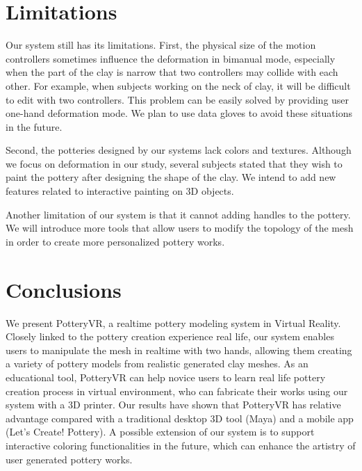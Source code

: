 \section{Limitations}
\label{sec:7}

Our system still has its limitations. First, the physical size of the motion controllers sometimes influence the deformation in bimanual mode, especially when the part of the clay is narrow that two controllers may collide with each other. For example, when subjects working on the neck of clay, it will be difficult to edit with two controllers. This problem can be easily solved by providing user one-hand deformation mode. We plan to use data gloves to avoid these situations in the future.

Second, the potteries designed by our systems lack colors and textures. Although we focus on deformation in our study, several subjects stated that they wish to paint the pottery after designing the shape of the clay. We intend to add new features related to interactive painting on 3D objects.

Another limitation of our system is that it cannot adding handles to the pottery. We will introduce more tools that allow users to modify the topology of the mesh in order to create more personalized pottery works.


\section{Conclusions}
\label{sec:8}

We present PotteryVR, a realtime pottery modeling system in Virtual Reality.
Closely linked to the pottery creation experience real life, our system enables users to manipulate the mesh in realtime with two hands, allowing them creating a variety of pottery models from realistic generated clay meshes.
As an educational tool, PotteryVR can help novice users to learn real life pottery creation process in virtual environment, who can fabricate their works using our system with a 3D printer.
Our results have shown that PotteryVR has relative advantage compared with a traditional desktop 3D tool (Maya) and a mobile app (Let's Create! Pottery).
A possible extension of our system is to support interactive coloring functionalities in the future, which can enhance the artistry of user generated pottery works.


